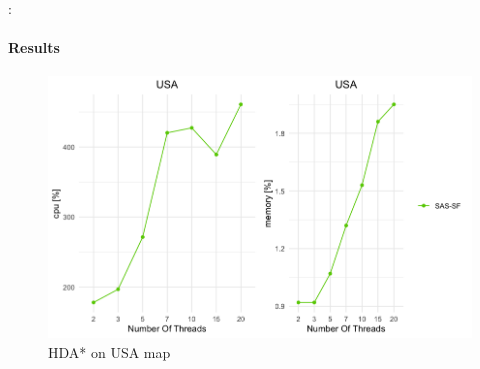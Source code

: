 \documentclass[12pt]{beamer}
\begin{document}
	\begin{frame}{\secname : \subsecname}
		\framesubtitle{Results}
		\begin{figure}[ht!]
			\centering
			\includegraphics[width=0.8\linewidth]{hda/usacpumem.png}
			\caption{HDA* on USA map}
		\end{figure}
	\end{frame}
\end{document}
